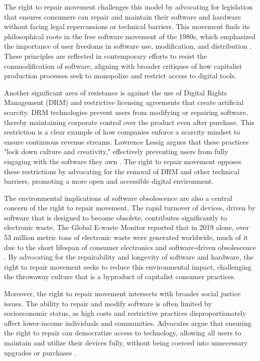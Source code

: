\begin{refsection}
The right to repair movement challenges this model by advocating for legislation that ensures consumers can repair and maintain their software and hardware without facing legal repercussions or technical barriers. This movement finds its philosophical roots in the free software movement of the 1980s, which emphasized the importance of user freedoms in software use, modification, and distribution \cite[pp.~30-33]{stallman2010free}. These principles are reflected in contemporary efforts to resist the commodification of software, aligning with broader critiques of how capitalist production processes seek to monopolize and restrict access to digital tools.

Another significant area of resistance is against the use of Digital Rights Management (DRM) and restrictive licensing agreements that create artificial scarcity. DRM technologies prevent users from modifying or repairing software, thereby maintaining corporate control over the product even after purchase. This restriction is a clear example of how companies enforce a scarcity mindset to ensure continuous revenue streams. Lawrence Lessig argues that these practices "lock down culture and creativity," effectively preventing users from fully engaging with the software they own \cite[pp.~19-21]{lessig2019free}. The right to repair movement opposes these restrictions by advocating for the removal of DRM and other technical barriers, promoting a more open and accessible digital environment.

The environmental implications of software obsolescence are also a central concern of the right to repair movement. The rapid turnover of devices, driven by software that is designed to become obsolete, contributes significantly to electronic waste. The Global E-waste Monitor reported that in 2019 alone, over 53 million metric tons of electronic waste were generated worldwide, much of it due to the short lifespan of consumer electronics and software-driven obsolescence \cite[pp.~50-53]{forti2020global}. By advocating for the repairability and longevity of software and hardware, the right to repair movement seeks to reduce this environmental impact, challenging the throwaway culture that is a byproduct of capitalist consumer practices.

Moreover, the right to repair movement intersects with broader social justice issues. The ability to repair and modify software is often limited by socioeconomic status, as high costs and restrictive practices disproportionately affect lower-income individuals and communities. Advocates argue that ensuring the right to repair can democratize access to technology, allowing all users to maintain and utilize their devices fully, without being coerced into unnecessary upgrades or purchases \cite[pp.~47-49]{klein2020fair}.


\end{refsection}
